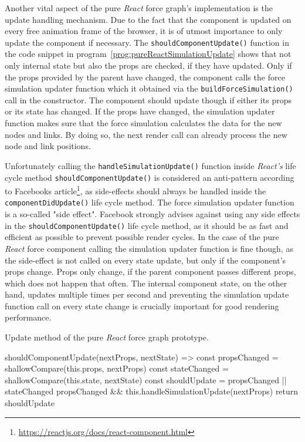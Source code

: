 Another vital aspect of the pure \emph{React} force graph's implementation is the update handling mechanism. Due to the fact that the component is updated on every free animation frame of the browser, it is of utmost importance to only update the component if necessary. The \texttt{shouldComponentUpdate()} function in the code snippet in program~\ref{prog:pureReactSimulationUpdate} shows that not only internal state but also the props are checked, if they have updated. Only if the props provided by the parent have changed, the component calls the force simulation updater function which it obtained via the \texttt{buildForceSimulation()} call in the constructor. The component should update though if either its props or its state has changed. If the props have changed, the simulation updater function makes sure that the force simulation calculates the data for the new nodes and links. By doing so, the next render call can already process the new node and link positions.

Unfortunately calling the \texttt{handleSimulationUpdate()} function inside \emph{React's} life cycle method \texttt{should\linebreak[0]{}Component\linebreak[0]{}Update()} is considered an anti-pattern according to Facebooks article\footnote{\url{https://reactjs.org/docs/react-component.html}}, as side-effects should always be handled inside the \texttt{component\linebreak[0]{}Did\linebreak[0]{}Update()} life cycle method. The force simulation updater function is a so-called "side effect". Facebook strongly advises against using any side effects in the \texttt{should\linebreak[0]{}Component\linebreak[0]{}Update()} life cycle method, as it should be as fast and efficient as possible to prevent possible render cycles. In the case of the pure \emph{React} force component calling the simulation updater function is fine though, as the side-effect is not called on every state update, but only if the component's props change. Props only change, if the parent component passes different props, which does not happen that often. The internal component state, on the other hand, updates multiple times per second and preventing the simulation update function call on every state change is crucially important for good rendering performance.

\begin{program}
\caption{Update method of the pure \emph{React} force graph prototype.}
\label{prog:pureReactSimulationUpdate}
\begin{JsCode}
shouldComponentUpdate(nextProps, nextState) => {
  const propsChanged = shallowCompare(this.props, nextProps)
  const stateChanged = shallowCompare(this.state, nextState)
  const shouldUpdate = propsChanged || stateChanged
  propsChanged && this.handleSimulationUpdate(nextProps)
  return shouldUpdate
}
\end{JsCode}
\end{program}

